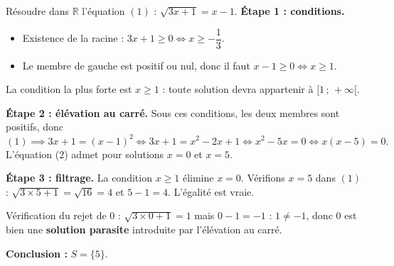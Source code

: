 \documentclass[11pt]{article}
\begin{document}
\begin{exoresolu}
Résoudre dans $\mathbb{R}$ l'équation $(1)$ : $\sqrt{3x+1} = x - 1$.
\tcblower
\textbf{Étape 1 : conditions.}
\begin{itemize}
\item Existence de la racine : $3x+1 \geq 0 \iff x \geq -\dfrac{1}{3}$.
\item Le membre de gauche est positif ou nul, donc il faut $x - 1 \geq 0 \iff x \geq 1$.
\end{itemize}
La condition la plus forte est $x \geq 1$ : toute solution devra appartenir à $[1\,;\,+\infty[$.

\textbf{Étape 2 : élévation au carré.} Sous ces conditions, les deux membres sont positifs, donc
\[ (1) \implies 3x+1 = (x-1)^2 \iff 3x+1 = x^2 - 2x + 1 \iff x^2 - 5x = 0 \iff x(x-5) = 0. \]
L'équation (2) admet pour solutions $x = 0$ et $x = 5$.

\textbf{Étape 3 : filtrage.} La condition $x \geq 1$ élimine $x = 0$. Vérifions $x = 5$ dans $(1)$ : $\sqrt{3\times 5 + 1} = \sqrt{16} = 4$ et $5 - 1 = 4$. L'égalité est vraie.

Vérification du rejet de $0$ : $\sqrt{3\times 0 + 1} = 1$ mais $0 - 1 = -1$ : $1 \neq -1$, donc $0$ est bien une \textbf{solution parasite} introduite par l'élévation au carré.

\textbf{Conclusion :} $S = \{5\}$.
\end{exoresolu}
\end{document}

